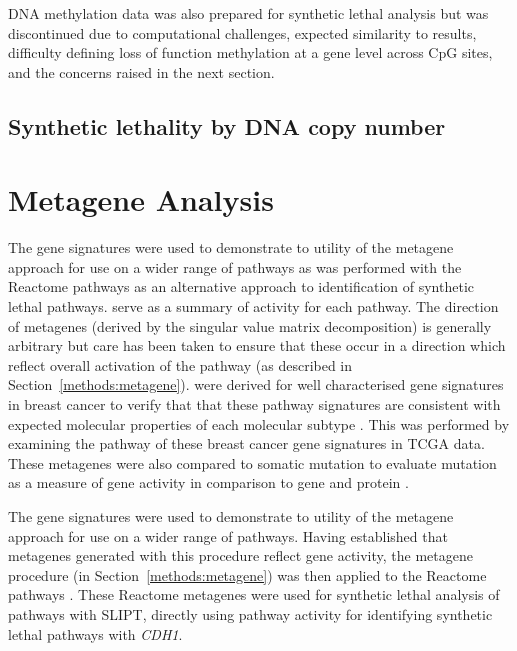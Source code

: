 DNA methylation data was also prepared for \gls{synthetic lethal} analysis but was discontinued due to computational challenges, expected similarity to  results, difficulty defining loss of function methylation at a gene level across \gls{CpG} sites, and the concerns raised in the next section. 

\subsection{Synthetic lethality by \acrshort{DNA} \gls{copy number}}


\fi


\section{Metagene Analysis}  \label{chapt3:metagene_results}

The gene signatures \citep{Gatza2011, Gatza2014} were used to demonstrate to utility of the \gls{metagene} approach for use on a wider range of pathways as was performed with the Reactome \citep{Reactome} pathways as an alternative approach to identification of \gls{synthetic lethal} pathways.  serve as a summary of activity for each pathway. The direction of \glspl{metagene} (derived by the singular value matrix decomposition) is generally arbitrary but care has been taken to ensure that these occur in a direction which reflect overall activation of the pathway (as described in Section~\ref{methods:metagene}).  were derived for well characterised gene signatures in breast cancer \citep{Gatza2011, Gatza2014} to verify that that these pathway signatures are consistent with expected molecular properties of each molecular subtype \citep{Perou2000, Parker2009}. This was performed by examining the pathway  of these breast cancer gene signatures in \gls{TCGA}  data. These \glspl{metagene} were also compared to \gls{somatic} \gls{mutation} to evaluate \gls{mutation} as a measure of gene activity in comparison to gene and protein .

The gene signatures \citep{Gatza2011, Gatza2014} were used to demonstrate to utility of the \gls{metagene} approach for use on a wider range of pathways. Having established that \glspl{metagene} generated with this procedure reflect gene activity, the \gls{metagene} procedure (in Section~\ref{methods:metagene}) was then applied to the Reactome pathways \citep{Reactome}. These Reactome \glspl{metagene} were used for \gls{synthetic lethal} analysis of pathways with \gls{SLIPT}, directly using pathway activity for identifying \gls{synthetic lethal} pathways with \textit{CDH1}.

